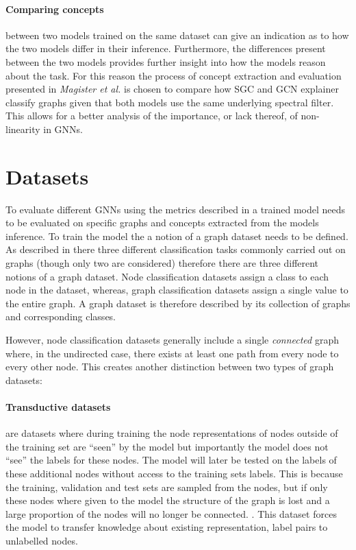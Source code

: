 \paragraph{Comparing concepts} between two models trained on the same dataset can give an indication as to how the two models differ in their inference.
Furthermore, the differences present between the two models provides further insight into how the models reason about the task.
For this reason the process of concept extraction and evaluation presented in \textit{Magister et al.}\cite{magister2021gcexplainer} is chosen to compare how SGC and GCN explainer classify graphs given that both models use the same underlying spectral filter.
This allows for a better analysis of the importance, or lack thereof, of non-linearity in GNNs.  

\section{Datasets}


To evaluate different GNNs using the metrics described in  a trained model needs to be evaluated on specific graphs and concepts extracted from the models inference.
To train the model the a notion of a graph dataset needs to be defined.
As described in  there three different classification tasks commonly carried out on graphs (though only two are considered) therefore there are three different notions of a graph dataset.
Node classification datasets assign a class to each node in the dataset, whereas, graph classification datasets assign a single value to the entire graph.
A graph dataset is therefore described by its collection of graphs and corresponding classes.

However, node classification datasets generally include a single \emph{connected} graph where, in the undirected case, there exists at least one path from every node to every other node.
This creates another distinction between two types of graph datasets:

\paragraph{Transductive datasets} are datasets where during training the node representations of nodes outside of the training set are ``seen'' by the model but importantly the model does not ``see'' the labels for these nodes.
The model will later be tested on the labels of these additional nodes without access to the training sets labels.
This is because the training, validation and test sets are sampled from the nodes, but if only these nodes where given to the model the structure of the graph is lost and a large proportion of the nodes will no longer be connected.
.
This dataset forces the model to transfer knowledge about existing representation, label pairs to unlabelled nodes.

